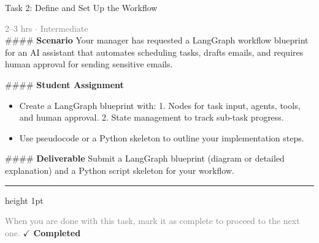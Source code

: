 \documentclass[10pt,a4paper]{article}
\begin{document}
\begin{taskbox}{Task 2: Define and Set Up the Workflow}

    {\small \textcolor{gray}{2--3 hrs $\cdot$ Intermediate}}\\[12pt]

    \#\#\#\# \textbf{Scenario}
Your manager has requested a LangGraph workflow blueprint for an AI assistant that automates scheduling tasks, drafts emails, and requires human approval for sending sensitive emails.

\#\#\#\# \textbf{Student Assignment}
\begin{itemize}
    \item Create a LangGraph blueprint with:
  1. Nodes for task input, agents, tools, and human approval.
  2. State management to track sub-task progress.
\end{itemize}

\begin{itemize}
    \item Use pseudocode or a Python skeleton to outline your implementation steps.
\end{itemize}

\#\#\#\# \textbf{Deliverable}
Submit a LangGraph blueprint (diagram or detailed explanation) and a Python script skeleton for your workflow.\par

    \vspace{16pt}

    \textcolor{cardBorder}{\hrule height 1pt}\vspace{8pt}

    \small \textcolor{gray}{When you are done with this task, mark it as complete to proceed to the next one.} \hfill \textbf{\textcolor{brandDark}{$\checkmark$ Completed}}

\end{taskbox}
\end{document}
